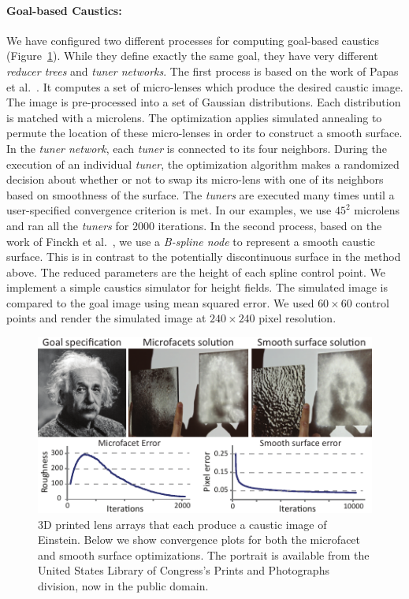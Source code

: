 \paragraph{Goal-based Caustics:}
We have configured two different processes for computing goal-based caustics (Figure~\ref{fig:caust2}). While they define exactly the same goal, they have very different \emph{reducer trees} and \emph{tuner networks}.
The first process is based on the work of Papas et al.~. It computes a set of micro-lenses which produce the desired caustic image. The image is pre-processed into a set of Gaussian distributions. Each distribution is matched with a microlens. The optimization applies simulated annealing to permute the location of these micro-lenses in order to construct a smooth surface. In the \emph{tuner network}, each \emph{tuner} is connected to its four neighbors. During the execution of an individual \emph{tuner}, the optimization algorithm makes a randomized decision about whether or not to swap its micro-lens with one of its neighbors based on smoothness of the surface. The \emph{tuners} are executed many times until a user-specified convergence criterion is met. In our examples, we use $45^2$ microlens and ran all the \emph{tuners} for $2000$ iterations. In the second process, based on the work of Finckh et al.~, we use a \emph{B-spline node} to represent a smooth caustic surface. This is in contrast to the potentially discontinuous surface in the method above. The reduced parameters are the height of each spline control point. We implement a simple caustics simulator for height fields. The simulated image is compared to the goal image using mean squared error. We used $60\times 60$ control points and render the simulated image at $240\times 240$ pixel resolution.


\begin{figure}
\centering
\includegraphics[width=0.65\linewidth]{figure/fig_caustic.pdf}
\caption {3D printed lens arrays that each produce a caustic image of Einstein.
Below we show convergence plots for both the microfacet and smooth surface optimizations.
The portrait is available from the United States Library of Congress's Prints and Photographs division,
now in the public domain.
}
\label{fig:caust2}
\end{figure}

